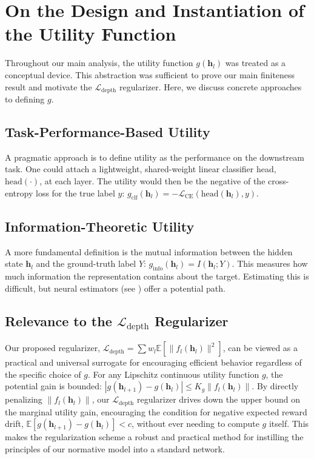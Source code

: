 \documentclass[12pt]{imsart}
\newcommand{\E}{\mathbb{E}}
\newcommand{\h}{\mathbf{h}}
\newcommand{\Ldepth}{\mathcal{L}_{\text{depth}}}
\theoremstyle{plain}
\theoremstyle{definition}
\begin{document}
\section{On the Design and Instantiation of the Utility Function}
\label{sec:utility}
Throughout our main analysis, the utility function $g(\h_l)$ was treated as a conceptual device. This abstraction was sufficient to prove our main finiteness result and motivate the $\Ldepth$ regularizer. Here, we discuss concrete approaches to defining $g$.

\subsection{Task-Performance-Based Utility} A pragmatic approach is to define utility as the performance on the downstream task. One could attach a lightweight, shared-weight linear classifier head, $\text{head}(\cdot)$, at each layer. The utility would then be the negative of the cross-entropy loss for the true label $y$: $g_{\text{clf}}(\h_l) = -\mathcal{L}_{\text{CE}}(\text{head}(\h_l), y)$.

\subsection{Information-Theoretic Utility} A more fundamental definition is the mutual information between the hidden state $\h_l$ and the ground-truth label $Y$: $g_{\text{info}}(\h_l) = I(\h_l; Y)$. This measures how much information the representation contains about the target. Estimating this is difficult, but neural estimators (see \cite{Belghazi2018}) offer a potential path.

\subsection{Relevance to the \texorpdfstring{$\Ldepth$}{L-depth} Regularizer}
Our proposed regularizer, $\Ldepth = \sum w_l \E[\|f_l(\h_l)\|^2]$, can be viewed as a practical and universal surrogate for encouraging efficient behavior regardless of the specific choice of $g$. For any Lipschitz continuous utility function $g$, the potential gain is bounded: $|g(\h_{l+1}) - g(\h_l)| \le K_g \|f_l(\h_l)\|$. By directly penalizing $\|f_l(\h_l)\|$, our $\Ldepth$ regularizer drives down the upper bound on the marginal utility gain, encouraging the condition for negative expected reward drift, $\E[g(\h_{l+1}) - g(\h_l)] < c$, without ever needing to compute $g$ itself. This makes the regularization scheme a robust and practical method for instilling the principles of our normative model into a standard network.
\end{document}
